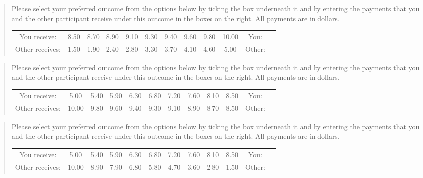 \documentclass[11pt]{article}
\begin{document}
\begin{tcolorbox}
\begin{quote}
\begin{center}
Please select your preferred outcome from the options below by ticking the box underneath it and by entering the payments that you and the other participant receive under this outcome in the boxes on the right. All payments are in dollars.\\

\begin{tabular}{c|c|c|c|c|c|c|c|c|c|c|c|}
\cline{2-12} You receive: & 8.50	&8.70&	8.90	&9.10	&9.30&	9.40	&9.60&	9.80	&10.00 & You:& \\ 
Other receives: &1.50	&1.90&	2.40&	2.80&	3.30&	3.70&	4.10&	4.60&	5.00 &Other: & \\ \cline{2-12}
\end{tabular}
\end{center}
\end{quote}
\end{tcolorbox}

\begin{tcolorbox}
\begin{quote}
\begin{center}
Please select your preferred outcome from the options below by ticking the box underneath it and by entering the payments that you and the other participant receive under this outcome in the boxes on the right. All payments are in dollars.\\

\begin{tabular}{c|c|c|c|c|c|c|c|c|c|c|c|}
\cline{2-12} You receive: & 5.00&	5.40	&5.90	&6.30	&6.80&	7.20	&7.60&	8.10&	8.50 & You:& \\ 
Other receives: &10.00&	9.80&	9.60	&9.40	&9.30&	9.10&	8.90&	8.70&	8.50 &Other: & \\ \cline{2-12}
\end{tabular}
\end{center}
\end{quote}
\end{tcolorbox}								

\begin{tcolorbox}
\begin{quote}
\begin{center}
Please select your preferred outcome from the options below by ticking the box underneath it and by entering the payments that you and the other participant receive under this outcome in the boxes on the right. All payments are in dollars.\\

\begin{tabular}{c|c|c|c|c|c|c|c|c|c|c|c|}
\cline{2-12} You receive: & 5.00	&5.40&	5.90&	6.30&	6.80&	7.20&	7.60&	8.10&	8.50 & You:& \\ 
Other receives: &10.00	&8.90&	7.90&	6.80&	5.80	&4.70&	3.60	&2.80&	1.50 &Other: & \\ \cline{2-12}
\end{tabular}
\end{center}
\end{quote}
\end{tcolorbox}
								
\end{document}
